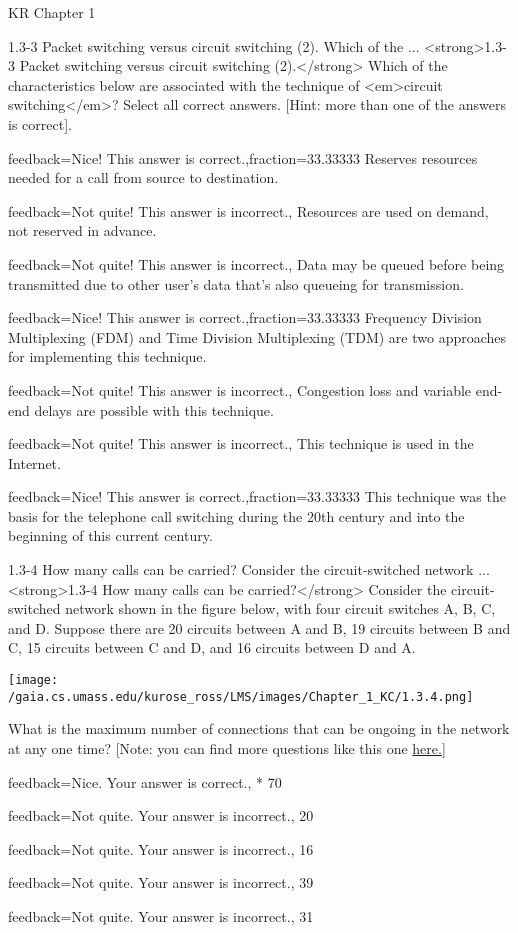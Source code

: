 \documentclass[a4paper]{article}
\begin{document}
\begin{quiz}{KR Chapter 1}
\begin{multi}[
	points=1,
	penalty=0.33333,
	multiple,
]{1.3-3 Packet switching versus circuit switching (2).  Which of the ...}
<strong>1.3-3 Packet switching versus circuit switching (2).</strong>  Which of the characteristics below are associated with the technique of <em>circuit switching</em>? Select all correct answers. [Hint: more than one of the answers is correct].
\item[feedback={Nice! This answer is correct.},fraction=33.33333] Reserves resources needed for a call from source to destination.
\item[feedback={Not quite! This answer is incorrect.},] Resources are used on demand, not reserved in advance.
\item[feedback={Not quite! This answer is incorrect.},] Data may be queued before being transmitted due to other user’s data that’s also queueing for transmission.
\item[feedback={Nice! This answer is correct.},fraction=33.33333] Frequency Division Multiplexing (FDM) and Time Division Multiplexing (TDM) are two approaches for implementing this technique.
\item[feedback={Not quite! This answer is incorrect.},] Congestion loss and variable end-end delays are possible with this technique.
\item[feedback={Not quite! This answer is incorrect.},] This technique is used in the Internet.
\item[feedback={Nice! This answer is correct.},fraction=33.33333] This technique was the basis for the telephone call switching during the 20th century and into the beginning of this current century.
\end{multi}

\begin{multi}[
	points=1,
	penalty=0.33333,
]{1.3-4 How many calls can be carried? Consider the circuit-switched network ...}
<strong>1.3-4 How many calls can be carried?</strong> Consider the circuit-switched network shown in the figure below, with  four circuit switches A, B, C, and D. Suppose there are 20 circuits between A and B, 19 circuits between B and C, 15 circuits between C and D, and 16 circuits between D and A. 
\begin{center}
\texttt{[image: /gaia.cs.umass.edu/kurose\_ross/LMS/images/Chapter\_1\_KC/1.3.4.png]}
\end{center}
 What is the maximum number of connections that can be ongoing in the network at any one time? [Note: you can find more questions like this one \href{http://gaia.cs.umass.edu/kurose_ross/interactive/circuit_switching.php}{here.]}
\item[feedback={Nice. Your answer is correct.},]* 70
\item[feedback={Not quite. Your answer is incorrect.},] 20
\item[feedback={Not quite. Your answer is incorrect.},] 16
\item[feedback={Not quite. Your answer is incorrect.},] 39
\item[feedback={Not quite. Your answer is incorrect.},] 31
\end{multi}


\end{quiz}
\end{document}
